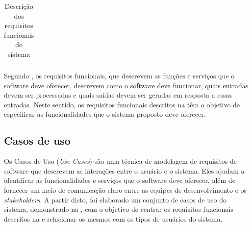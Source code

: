 \begin{table}[H]
{\begin{tabular}{|l|l|}
\end{tabular}%
}
\caption{Descrição dos requisitos funcionais do sistema}
\label{table:requisitos_funcionais}
\end{table}

Segundo \cite{pressman2016engenharia}, os requisitos funcionais, que descrevem as funções e serviços que o software deve oferecer, descrevem como o software deve funcionar, quais entradas devem ser processadas e quais saídas devem ser geradas em resposta a essas entradas. Neste sentido, os requisitos funcionais descritos na  têm o objetivo de especificar as funcionalidades que o sistema proposto deve oferecer.

\subsection{Casos de uso}\label{ssec:casos_de_uso}

Os Casos de Uso (\textit{Use Cases}) são uma técnica de modelagem de requisitos de software que descrevem as interações entre o usuário e o sistema. Eles ajudam a identificar as funcionalidades e serviços que o software deve oferecer, além de fornecer um meio de comunicação claro entre as equipes de desenvolvimento e os \textit{stakeholders}. A partir disto, foi elaborado um conjunto de casos de uso do sistema, demonstrado na , com o objetivo de centrar os requisitos funcionais descritos na  e relacionar os mesmos com os tipos de usuários do sistema.

